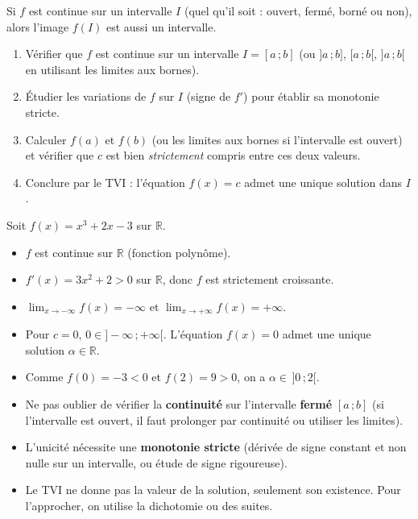 \documentclass[11pt]{article}
\begin{document}
\begin{propriete}
Si $f$ est continue sur un intervalle $I$ (quel qu'il soit : ouvert, fermé, borné ou non), alors l'image $f(I)$ est aussi un intervalle.
\end{propriete}

\begin{methode}[Montrer l'existence et l'unicité d'une solution de $f(x)=c$]
\begin{enumerate}
\item Vérifier que $f$ est continue sur un intervalle $I=[a\,;b]$ (ou $]a\,;b]$, $[a\,;b[$, $]a\,;b[$ en utilisant les limites aux bornes).
\item Étudier les variations de $f$ sur $I$ (signe de $f'$) pour établir sa monotonie stricte.
\item Calculer $f(a)$ et $f(b)$ (ou les limites aux bornes si l'intervalle est ouvert) et vérifier que $c$ est bien \emph{strictement} compris entre ces deux valeurs.
\item Conclure par le TVI : l'équation $f(x)=c$ admet une unique solution dans $I$.
\end{enumerate}
\end{methode}

\begin{exemplebox}
Soit $f(x)=x^3+2x-3$ sur $\mathbb{R}$.
\begin{itemize}
\item $f$ est continue sur $\mathbb{R}$ (fonction polynôme).
\item $f'(x)=3x^2+2 > 0$ sur $\mathbb{R}$, donc $f$ est strictement croissante.
\item $\lim_{x\to-\infty}f(x)=-\infty$ et $\lim_{x\to+\infty}f(x)=+\infty$.
\item Pour $c=0$, $0\in]-\infty\,;+\infty[$. L'équation $f(x)=0$ admet une unique solution $\alpha\in\mathbb{R}$.
\item Comme $f(0)=-3<0$ et $f(2)=9>0$, on a $\alpha\in\,]0\,;2[$.
\end{itemize}
\end{exemplebox}

\begin{attention}
\begin{itemize}
\item Ne pas oublier de vérifier la \textbf{continuité} sur l'intervalle \textbf{fermé} $[a\,;b]$ (si l'intervalle est ouvert, il faut prolonger par continuité ou utiliser les limites).
\item L'unicité nécessite une \textbf{monotonie stricte} (dérivée de signe constant et non nulle sur un intervalle, ou étude de signe rigoureuse).
\item Le TVI ne donne pas la valeur de la solution, seulement son existence. Pour l'approcher, on utilise la dichotomie ou des suites.
\end{itemize}
\end{attention}
\end{document}
